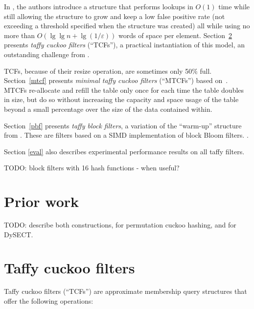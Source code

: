 \documentclass[manuscript,screen,review]{acmart}
\begin{document}
In \cite{psw}, the authors introduce a structure that performs lookups in $O(1)$ time while still allowing the structure to grow and keep a low false positive rate (not exceeding a threshold specified when the structure was created) all while using no more than $O(\lg \lg n + \lg (1/\varepsilon))$ words of space per element.
Section~\ref{tcf} presents {\em taffy cuckoo filters} (``TCFs''), a practical instantiation of this model, an outstanding challenge from \cite{psw}.

TCFs, because of their resize operation, are sometimes only 50\% full.
Section~\ref{mtcf} presents {\em minimal taffy cuckoo filters} (``MTCFs'') based on~\cite{dysect}.
MTCFs re-allocate and refill the table only once for each time the table doubles in size, but do so without increasing the capacity and space usage of the table beyond a small percentage over the size of the data contained within.

Section~\ref{pbf} presents {\em taffy block filters}, a variation of the ``warm-up'' structure from \cite{psw}.
These are filters based on a SIMD implementation of block Bloom filters. \cite{block-bloom}.

Section \ref{eval} also describes experimental performance results on all taffy filters.

TODO: block filters with 16 hash functions - when useful?

\section{Prior work}



TODO: describe both \cite{psw} constructions, \cite{backyard} for permutation cuckoo hashing, and \cite{dysect} for DySECT.

\section{Taffy cuckoo filters}
\label{tcf}
Taffy cuckoo filters (``TCFs'') are approximate membership query structures that offer the following operations:
\end{document}
